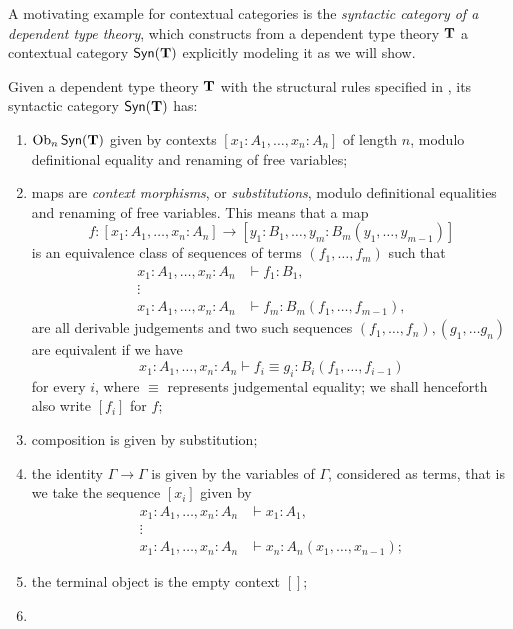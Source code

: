 A motivating example for contextual categories is the \emph{syntactic category
of a dependent type theory}, which constructs from a dependent type theory
$\operatorname{\mathbf{T}}$ a contextual category $\mathsf{Syn}(\mathbf{\operatorname{\mathbf{T}}})$ explicitly modeling it as we will show.

\begin{construction}\cite[2.6]{Car78}
  Given a dependent type theory $\operatorname{\mathbf{T}}$ with the structural rules specified in
  \cite[A.1]{KL12}, its syntactic category $\mathsf{Syn}(\mathbf{\operatorname{\mathbf{T}}})$ has:
  \begin{enumerate}
    \item $\operatorname{Ob}_n\mathsf{Syn}(\mathbf{\operatorname{\mathbf{T}}})$ given by contexts $[x_1:A_1,\ldots,x_n:A_n]$ of length
      $n$, modulo definitional equality and renaming of free variables;
    \item maps are \emph{context morphisms}, or \emph{substitutions}, modulo
      definitional equalities and renaming of free variables. This means that a
      map
      \[f\colon[x_1:A_1,\ldots,x_n:A_n]\rightarrow[y_1:B_1,\ldots,y_m:B_m(y_1,\ldots,y_{m-1})]\]
      is an equivalence class of sequences of terms $(f_1,\ldots,f_m)$ such that
      \begin{align*}
        x_1:A_1,\ldots,x_n:A_n &\vdash f_1:B_1, \\
        \vdots & \\
        x_1:A_1,\ldots,x_n:A_n &\vdash f_m:B_m(f_1,\ldots,f_{m-1}),
      \end{align*}
      are all derivable judgements and two such sequences
      $(f_1,\ldots,f_n),(g_1,\ldots g_n)$ are equivalent if we have
      \[x_1:A_1,\ldots,x_n:A_n\vdash f_i\equiv g_i:B_i(f_1,\ldots,f_{i-1})\]
      for every $i$, where $\equiv$ represents judgemental equality; we shall
      henceforth also write $[f_i]$ for $f$;
    \item composition is given by substitution;
    \item the identity $\Gamma\rightarrow\Gamma$ is given by the variables of
      $\Gamma$, considered as
      terms, that is we take the sequence $[x_i]$ given by
      \begin{align*}
        x_1:A_1,\ldots,x_n:A_n &\vdash x_1:A_1, \\
        \vdots & \\
        x_1:A_1,\ldots,x_n:A_n &\vdash x_n:A_n(x_1,\ldots,x_{n-1});
      \end{align*}
    \item the terminal object is the empty context $[]$;
    \item

\end{enumerate}
\end{construction}
